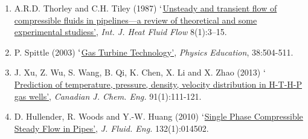 \documentclass[12pts,a4paper]{report}%
\begin{document}
\begin{enumerate}[label=\bfseries Group \arabic*:]
%
\item A.R.D. Thorley and C.H. Tiley (1987) \href{http://dx.doi.org/10.1016/0142-727X(87)90044-0}{$\lq$Unsteady and transient flow of compressible fluids in pipelines—a review of theoretical and some experimental studiess'}, {\it Int. J. Heat Fluid Flow} 8(1):3–15.
%
\item P. Spittle (2003) \href{http://dx.doi.org/10.1088/0031-9120/38/6/002}{$\lq$Gas Turbine Technology'}, {\it Physics Education}, 38:504-511.
%
\item J. Xu, Z. Wu, S. Wang, B. Qi, K. Chen, X. Li and X. Zhao (2013) \href{http://onlinelibrary.wiley.com/doi/10.1002/cjce.20689/abstract}{$\lq$Prediction of temperature, pressure, density, velocity distribution in H-T-H-P gas wells'}, {\it Canadian J. Chem. Eng.} 91(1):111-121.
%
\item D. Hullender, R. Woods and Y.-W. Huang (2010) \href{http://dx.doi.org/10.1115/1.4000742}{$\lq$Single Phase Compressible Steady Flow in Pipes'}, {\it J. Fluid. Eng.} 132(1):014502.
%
%
%
\end{enumerate}

%
%
%
%



%  
\end{document}
